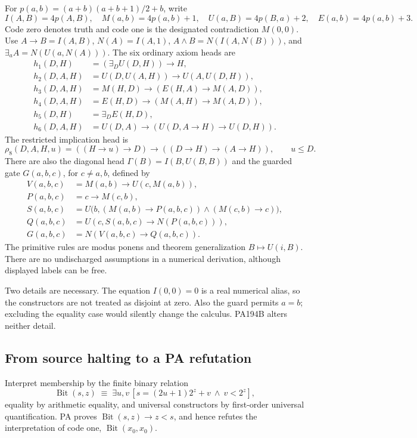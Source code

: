 \documentclass[11pt]{article}
\begin{document}
For \(p(a,b)=(a+b)(a+b+1)/2+b\), write
\[
 I(A,B)=4p(A,B),\quad M(a,b)=4p(a,b)+1,\quad
 U(a,B)=4p(B,a)+2,\quad E(a,b)=4p(a,b)+3.
\]
Code zero denotes truth and code one is the designated contradiction
\(M(0,0)\). Use \(A\to B=I(A,B)\), \(N(A)=I(A,1)\),
\(A\wedge B=N(I(A,N(B)))\), and \(\exists_a A=N(U(a,N(A)))\).
The six ordinary axiom heads are
\begin{align*}
 h_1(D,H)&=(\exists_D U(D,H))\to H,\\
 h_2(D,A,H)&=U(D,U(A,H))\to U(A,U(D,H)),\\
 h_3(D,A,H)&=M(H,D)\to(E(H,A)\to M(A,D)),\\
 h_4(D,A,H)&=E(H,D)\to(M(A,H)\to M(A,D)),\\
 h_5(D,H)&=\exists_D E(H,D),\\
 h_6(D,A,H)&=U(D,A)\to(U(D,A\to H)\to U(D,H)).
\end{align*}
The restricted implication head is
\[
 \rho_8(D,A,H,u)=((H\to u)\to D)\to((D\to H)\to(A\to H)),
 \qquad u\le D.
\]
There are also the diagonal head \(\Gamma(B)=I(B,U(B,B))\)
and the guarded gate \(G(a,b,c)\), for \(c\ne a,b\), defined by
\begin{align*}
 V(a,b,c)&=M(a,b)\to U(c,M(a,b)),\\
 P(a,b,c)&=c\to M(c,b),\\
 S(a,b,c)&=U\bigl(b,(M(a,b)\to P(a,b,c))
                         \wedge(M(c,b)\to c)\bigr),\\
 Q(a,b,c)&=U(c,S(a,b,c)\to N(P(a,b,c))),\\
 G(a,b,c)&=N(V(a,b,c)\to Q(a,b,c)).
\end{align*}
The primitive rules are modus ponens and theorem generalization
\(B\mapsto U(i,B)\). There are no undischarged assumptions in a numerical
derivation, although displayed labels can be free.

Two details are necessary. The equation \(I(0,0)=0\) is a real numerical
alias, so the constructors are not treated as disjoint at zero. Also the
guard permits \(a=b\); excluding the equality case would silently change
the calculus. PA194B alters neither detail.

\subsection{From source halting to a PA refutation}
Interpret membership by the finite binary relation
\[
 \operatorname{Bit}(s,z)\;\equiv\;
 \exists u,v\,[s=(2u+1)2^z+v\ \wedge\ v<2^z],
\]
equality by arithmetic equality, and universal constructors by first-order
universal quantification. PA proves \(\operatorname{Bit}(s,z)\to z<s\),
and hence refutes the interpretation of code one,
\(\operatorname{Bit}(x_0,x_0)\).
\end{document}
